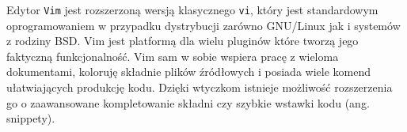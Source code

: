 \par
Edytor \texttt{Vim} jest rozszerzoną wersją klasycznego \texttt{vi}, który jest standardowym oprogramowaniem w przypadku dystrybucji zarówno GNU/Linux jak i systemów z rodziny BSD. Vim jest platformą dla wielu pluginów które tworzą jego faktyczną funkcjonalność. Vim sam w sobie wspiera pracę z wieloma dokumentami, koloruję składnie plików źródłowych i posiada wiele komend ułatwiających produkcję kodu. Dzięki wtyczkom istnieje możliwość rozszerzenia go o zaawansowane kompletowanie składni czy szybkie wstawki kodu (ang. snippety).

\clearpage
